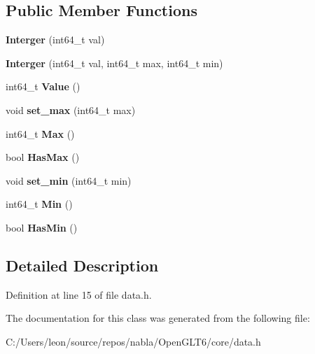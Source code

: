 \subsection*{Public Member Functions}
\begin{DoxyCompactItemize}
\item 
\mbox{\label{classnabla_1_1data_1_1_interger_a953a543e5b10052bd7bddc175a41637b}} 
{\bfseries Interger} (int64\+\_\+t val)
\item 
\mbox{\label{classnabla_1_1data_1_1_interger_a0ea5712a1f73a0c12e1427eb890f620e}} 
{\bfseries Interger} (int64\+\_\+t val, int64\+\_\+t max, int64\+\_\+t min)
\item 
\mbox{\label{classnabla_1_1data_1_1_interger_a3bbd8bd6b1e1815820e91624ec3e8b15}} 
int64\+\_\+t {\bfseries Value} ()
\item 
\mbox{\label{classnabla_1_1data_1_1_interger_a2966879b4333e9ff34458a07b658cc94}} 
void {\bfseries set\+\_\+max} (int64\+\_\+t max)
\item 
\mbox{\label{classnabla_1_1data_1_1_interger_aea133995f3dff9968a6043329f66363e}} 
int64\+\_\+t {\bfseries Max} ()
\item 
\mbox{\label{classnabla_1_1data_1_1_interger_a626cb9b056389503fa1dff01c02ddb9f}} 
bool {\bfseries Has\+Max} ()
\item 
\mbox{\label{classnabla_1_1data_1_1_interger_a6a8f7127f186c70e6ef58f91814c43e4}} 
void {\bfseries set\+\_\+min} (int64\+\_\+t min)
\item 
\mbox{\label{classnabla_1_1data_1_1_interger_a45433ae8b5f064f9acd1667a0f9dbdc0}} 
int64\+\_\+t {\bfseries Min} ()
\item 
\mbox{\label{classnabla_1_1data_1_1_interger_a0c41372880c86fc38f8a38f425f4153d}} 
bool {\bfseries Has\+Min} ()
\end{DoxyCompactItemize}


\subsection{Detailed Description}


Definition at line 15 of file data.\+h.



The documentation for this class was generated from the following file\+:\begin{DoxyCompactItemize}
\item 
C\+:/\+Users/leon/source/repos/nabla/\+Open\+G\+L\+T6/core/data.\+h\end{DoxyCompactItemize}
